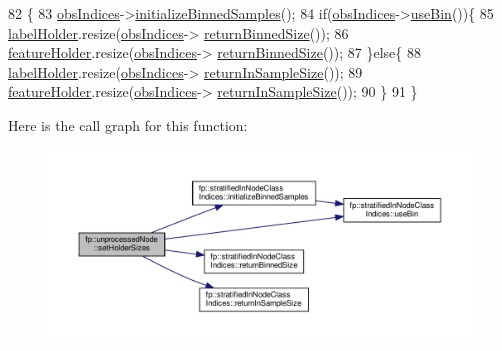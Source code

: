 \begin{DoxyCode}
82                                             \{
83                     \hyperlink{classfp_1_1unprocessedNode_aba9f03124658f62906fa8ded53cef535}{obsIndices}->\hyperlink{classfp_1_1stratifiedInNodeClassIndices_ae9907f8984615f91417fb7961e1b582d}{initializeBinnedSamples}();
84                     \textcolor{keywordflow}{if}(\hyperlink{classfp_1_1unprocessedNode_aba9f03124658f62906fa8ded53cef535}{obsIndices}->\hyperlink{classfp_1_1stratifiedInNodeClassIndices_af740a8054cefe977f8f1288fc6b39109}{useBin}())\{
85                         \hyperlink{classfp_1_1unprocessedNode_a2aa2f9dcba0b0a859457ed22e147f698}{labelHolder}.resize(\hyperlink{classfp_1_1unprocessedNode_aba9f03124658f62906fa8ded53cef535}{obsIndices}->
      \hyperlink{classfp_1_1stratifiedInNodeClassIndices_a9f77fe5e638170c4ad4ce99541561cfc}{returnBinnedSize}());
86                         \hyperlink{classfp_1_1unprocessedNode_ac2a435f6f38c5c0d2b4ba4b721fd5eaa}{featureHolder}.resize(\hyperlink{classfp_1_1unprocessedNode_aba9f03124658f62906fa8ded53cef535}{obsIndices}->
      \hyperlink{classfp_1_1stratifiedInNodeClassIndices_a9f77fe5e638170c4ad4ce99541561cfc}{returnBinnedSize}());
87                     \}\textcolor{keywordflow}{else}\{
88                         \hyperlink{classfp_1_1unprocessedNode_a2aa2f9dcba0b0a859457ed22e147f698}{labelHolder}.resize(\hyperlink{classfp_1_1unprocessedNode_aba9f03124658f62906fa8ded53cef535}{obsIndices}->
      \hyperlink{classfp_1_1stratifiedInNodeClassIndices_a596235ffec7250fabd2818d395b39c66}{returnInSampleSize}());
89                         \hyperlink{classfp_1_1unprocessedNode_ac2a435f6f38c5c0d2b4ba4b721fd5eaa}{featureHolder}.resize(\hyperlink{classfp_1_1unprocessedNode_aba9f03124658f62906fa8ded53cef535}{obsIndices}->
      \hyperlink{classfp_1_1stratifiedInNodeClassIndices_a596235ffec7250fabd2818d395b39c66}{returnInSampleSize}());
90                     \}
91                 \}
\end{DoxyCode}
Here is the call graph for this function\+:
\nopagebreak
\begin{figure}[H]
\begin{center}
\leavevmode
\includegraphics[width=350pt]{classfp_1_1unprocessedNode_ae1aa4f8f868fe19c8e48d3fe1e5596a8_cgraph}
\end{center}
\end{figure}
\mbox{\label{classfp_1_1unprocessedNode_a713ab68816b13b1a82d667ac6f1640d7}} 
